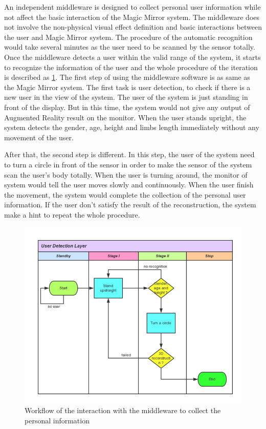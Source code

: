 An independent middleware is designed to collect personal user information while not affect the basic interaction of the Magic Mirror system. The middleware does not involve the non-physical visual effect definition and basic interactions between the user and Magic Mirror system. The procedure of the automatic recognition would take several minutes as the user need to be scanned by the sensor totally.  Once the middleware detects a user within the valid range of the system, it starts to recognize the information of the user and the whole procedure of the iteration is described as \figurename{\ref{fig:3-PRMM:InteractionWithMiddleware}}.
The first step of using the middleware software is as same as the Magic Mirror system. The first task is user detection, to check if there is a new user in the view of the system. The user of the system is just standing in front of the display. But in this time, the system would not give any output of Augmented Reality result on the monitor. When the user stands upright, the system detects the gender, age, height and limbs length immediately without any movement of the user. 

After that, the second step is different. In this step, the user of the system need to turn a circle in front of the sensor in order to make the sensor of the system scan the user's body totally. When the user is turning around, the monitor of system would tell the user moves slowly and continuously. When the user finish the movement, the system would complete the collection of the personal user information. If the user don't satisfy the result of the reconstruction, the system make a hint to repeat the whole procedure.
\begin{figure}
	\centering
	\includegraphics[width=0.7\linewidth]{figures/3-PRMM/InteractionWithMiddleware.png}
	\caption{Workflow of the interaction with the middleware to collect the personal information}
	\label{fig:3-PRMM:InteractionWithMiddleware}
\end{figure}

